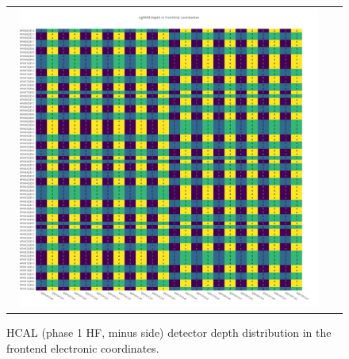 \begin{figure}[htb]
 \begin{center}
  \begin{tabular}{cc}
   \includegraphics[angle=0,width=0.95\textwidth]{figures/appendix/ngHFM_Depth_in_FrontEnd.png}
  \end{tabular}
  \caption{HCAL (phase 1 HF, minus side) detector depth distribution in the frontend electronic coordinates.}
  \label{fig:lmapngHFMDepthFEC}
 \end{center}
\end{figure}
\clearpage

